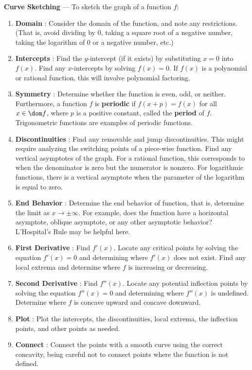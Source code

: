 \documentclass{book}
\begin{document}
\textbf{Curve Sketching} --- To sketch the graph of a function $f$:
\begin{enumerate}[!THM!,start=1]
\item \textbf{Domain} : Consider the domain of the function, and note any restrictions. (That is, avoid dividing by 0, taking a square root of a negative number, taking the logarithm of 0 or a negative number, etc.)

\item \textbf{Intercepts} : Find the $y$-intercept (if it exists) by substituting $x= 0$ into $f(x)$. Find any $x$-intercepts by solving $f(x) = 0$. If $f(x)$ is a polynomial or rational function, this will involve polynomial factoring.

\item \textbf{Symmetry} : Determine whether the function is even, odd, or neither. Furthermore, a function $f$ is \textbf{periodic} if $f(x+p) = f(x)$ for all $x\in \dom f$, where $p$ is a positive constant, called the \textbf{period} of $f$. Trigonometric functions are examples of periodic functions.

\item \textbf{Discontinuities} : Find any removable and jump discontinuities.  This might require analyzing the switching points of a piece-wise function. Find any vertical  asymptotes of the graph. For a rational function, this corresponds to when the denominator is zero but the numerator is nonzero. For logarithmic functions, there is a vertical asymptote when the parameter of the logarithm is equal to zero.

\item \textbf{End Behavior} : Determine the end behavior of function, that is, determine the limit as $x\to \pm\infty$. For example, does the function have a horizontal asymptote, oblique asymptote, or any other asymptotic behavior? L'Hospital's Rule may be helpful here.

\item \textbf{First Derivative} : Find $f'(x)$. Locate any critical points by solving the equation $f'(x) = 0$ and determining where $f'(x)$ does not exist. Find any local extrema and determine where $f$ is increasing or decreasing.

\item \textbf{Second Derivative} : Find $f''(x)$. Locate any potential inflection points by solving the equation $f''(x) = 0$ and determining where $f''(x)$ is undefined. Determine where $f$ is concave upward and concave downward.

\item \textbf{Plot} : Plot the intercepts, the discontinuities, local extrema, the inflection points,  and other points as needed.

\item \textbf{Connect} : Connect the points with a smooth curve using the correct concavity, being careful not to connect points where the function is not defined.\\
\end{enumerate}
\end{document}
